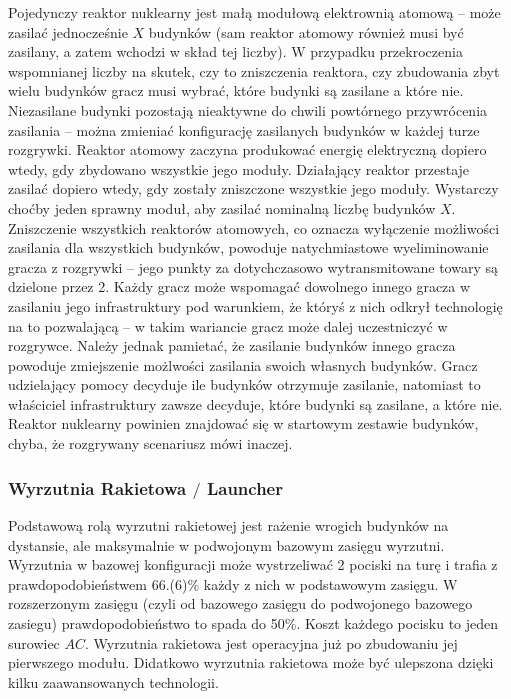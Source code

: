 \documentclass[11pt,a4paper]{article}
\begin{document}
Pojedynczy reaktor nuklearny jest małą modułową elektrownią atomową -- może zasilać jednocześnie $X$ budynków (sam reaktor atomowy również musi być zasilany, a zatem wchodzi w skład tej liczby). W przypadku przekroczenia wspomnianej liczby na skutek, czy to zniszczenia reaktora, czy zbudowania zbyt wielu budynków gracz musi wybrać, które budynki są zasilane a które nie. Niezasilane budynki pozostają nieaktywne do chwili powtórnego przywrócenia zasilania -- można zmieniać konfigurację zasilanych budynków w każdej turze rozgrywki. Reaktor atomowy zaczyna produkować energię elektryczną dopiero wtedy, gdy zbydowano wszystkie jego moduły. Działający reaktor przestaje zasilać dopiero wtedy, gdy zostały zniszczone wszystkie jego moduły. Wystarczy choćby jeden sprawny moduł, aby zasilać nominalną liczbę budynków $X$. Zniszczenie wszystkich reaktorów atomowych, co oznacza wyłączenie możliwości zasilania dla wszystkich budynków, powoduje natychmiastowe wyeliminowanie gracza z rozgrywki -- jego punkty za dotychczasowo wytransmitowane towary są dzielone przez 2. Każdy gracz może wspomagać dowolnego innego gracza w zasilaniu jego infrastruktury pod warunkiem, że któryś z nich odkrył technologię na to pozwalającą -- w takim wariancie gracz może dalej uczestniczyć w rozgrywce. Należy jednak pamietać, że zasilanie budynków innego gracza powoduje zmiejszenie możlwości zasilania swoich własnych budynków. Gracz udzielający pomocy decyduje ile budynków otrzymuje zasilanie, natomiast to właściciel infrastruktury zawsze decyduje, które budynki są zasilane, a które nie. Reaktor nuklearny powinien znajdować się w startowym zestawie budynków, chyba, że rozgrywany scenariusz mówi inaczej.

\subsubsection{Wyrzutnia Rakietowa $/$ Launcher}

Podstawową rolą wyrzutni rakietowej jest rażenie wrogich budynków na dystansie, ale maksymalnie w podwojonym bazowym zasięgu wyrzutni. Wyrzutnia w bazowej konfiguracji może wystrzeliwać 2 pociski na turę i trafia z prawdopodobieństwem 66.(6)\% każdy z nich w podstawowym zasięgu. W rozszerzonym zasięgu (czyli od bazowego zasięgu do podwojonego bazowego zasiegu) prawdopodobieństwo to spada do 50\%. Koszt każdego pocisku to jeden surowiec $AC$. Wyrzutnia rakietowa jest operacyjna już po zbudowaniu jej pierwszego modułu. Didatkowo wyrzutnia rakietowa może być ulepszona dzięki kilku zaawansowanych technologii.
\end{document}

